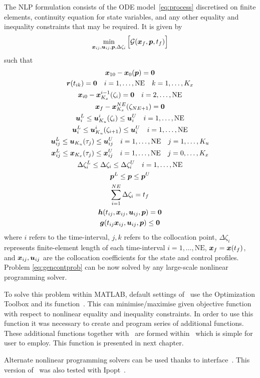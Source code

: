 The NLP formulation consists of the ODE model~\eqref{eq:process}
discretised on finite elements, continuity equation for state
variables, and any other equality and inequality constraints that may
be required. It is given by 
\begin{equation}
\min_{\ve{x}_{ij},\ve{u}_{ij},\ve{p},\Delta\zeta_{i}}\Big[\mf{G}(\ve{x}_{f},\ve{p},t_{f})\Big]
\label{eq:nlpform} 
\end{equation}
such that
\begin{gather*}
\ve{x}_{10}-\ve{x}_{0}(\ve{p}) = \ve{0}\\
\ve{r}(t_{ik}) = \ve{0} \quad i=1,\ldots,\textrm{NE} \quad k=1,\ldots,K_{x}\\
\ve{x}_{i0} - \ve{x}_{K_{x}}^{i-1}(\zeta_{i}) = \ve{0} \quad
i=2,\ldots,\textrm{NE}\\
\ve{x}_{f} - \ve{x}_{K_{x}}^{NE}(\zeta_{NE+1}) = \ve{0}\\ 
\ve{u}_{i}^{L} \leq \ve{u}_{K_{u}}^{i}(\zeta_{i}) \leq \ve{u}_{i}^{U} \quad
i=1,\ldots,\textrm{NE}\\ 
\ve{u}_{i}^{L} \leq \ve{u}_{K_{u}}^{i}(\zeta_{i+1}) \leq \ve{u}_{i}^{U}
\quad i=1,\ldots,\textrm{NE}\\
\ve{u}_{ij}^{L} \leq \ve{u}_{K_{u}}(\tau_{j}) \leq \ve{u}_{ij}^{U} \quad
i=1,\ldots,\textrm{NE} \quad j=1,\ldots,K_{u}\\
\ve{x}_{ij}^{L} \leq \ve{x}_{K_{x}}(\tau_{j}) \leq \ve{x}_{ij}^{U} \quad
i=1,\ldots,\textrm{NE} \quad j=0,\ldots,K_{x}\\
\Delta\zeta_{i}^{L}\leq\Delta\zeta_{i}\leq\Delta\zeta_{i}^{U} \quad
i=1,\ldots,\textrm{NE}\\
\ve{p}^{L} \leq \ve{p} \leq \ve{p}^{U}\\
\sum_{i=1}^{NE}\Delta\zeta_{i} = t_f\\
\ve{h}(t_{ij},\ve{x}_{ij},\ve{u}_{ij},\ve{p}) = \ve{0}\\
\ve{g}(t_{ij}\ve{x}_{ij},\ve{u}_{ij},\ve{p}) \leq \ve{0} 
\end{gather*} where $i$ refers to the time-interval, $j, k$ refers to
the collocation point, $\Delta\zeta_{i}$ represents finite-element
length of each time-interval $i=1,\ldots,\textrm{NE}$, $\ve{x}_{f} =
\ve{x}(t_{f})$, and $\ve{x}_{ij}, \ve{u}_{ij}$ are the collocation
coefficients for the state and control profiles. Problem
\eqref{eq:gencontprob} can be now solved by any large-scale nonlinear
programming solver.

To solve this problem within MATLAB, default settings of~
use the Optimization Toolbox and its function~. This can
minimise/maximise given objective function with respect to nonlinear
equality and inequality constraints. In order to use this function it
was necessary to create and program series of additional
functions. These additional functions together with~ are
formed within~ which is simple for user to employ. This
function is presented in next chapter.

Alternate nonlinear programming solvers can be used thanks to
interface~. This version of~ was also tested
with Ipopt~\citep{waech06}.



